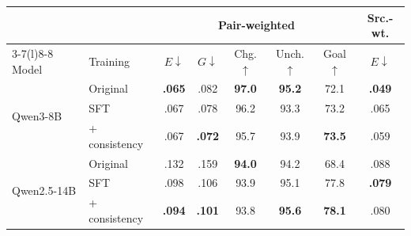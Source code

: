 \begin{tabular}{@{}llcccccc@{}}
\toprule
 & & \multicolumn{5}{c}{Pair-weighted} & Src.-wt.\\
\cmidrule(lr){3-7}\cmidrule(l){8-8}
Model & Training & $E\!\downarrow$ & $G\!\downarrow$ & Chg.$\uparrow$ & Unch.$\uparrow$ & Goal$\uparrow$ & $E\!\downarrow$ \\
\midrule
\multirow{3}{*}{Qwen3-8B} & Original & \textbf{.065} & .082 & \textbf{97.0} & \textbf{95.2} & 72.1 & \textbf{.049} \\
 & SFT & .067 & .078 & 96.2 & 93.3 & 73.2 & .065 \\
 & + consistency & .067 & \textbf{.072} & 95.7 & 93.9 & \textbf{73.5} & .059 \\
\midrule
\multirow{3}{*}{Qwen2.5-14B} & Original & .132 & .159 & \textbf{94.0} & 94.2 & 68.4 & .088 \\
 & SFT & .098 & .106 & 93.9 & 95.1 & 77.8 & \textbf{.079} \\
 & + consistency & \textbf{.094} & \textbf{.101} & 93.8 & \textbf{95.6} & \textbf{78.1} & .080 \\
\bottomrule
\end{tabular}
